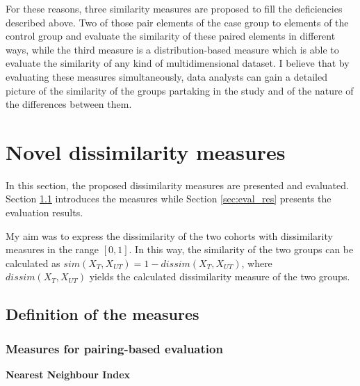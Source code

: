 
For these reasons, three similarity measures are proposed to fill the deficiencies described above. Two of those pair elements of the case group to elements of the control group and evaluate the similarity of these paired elements in different ways, while the third measure is a distribution-based measure which is able to evaluate the similarity of any kind of multidimensional dataset. I believe that by evaluating these measures simultaneously, data analysts can gain a detailed picture of the similarity of the groups partaking in the study and of the nature of the differences between them.

\section{Novel dissimilarity measures}
\label{sec:measure}

In this section, the proposed dissimilarity measures are presented and evaluated. Section \ref{sec:def_meas} introduces the measures while Section \ref{sec:eval_res} presents the evaluation results.

My aim was to express the dissimilarity of the two cohorts with dissimilarity measures in the range $[0,1]$. In this way, the similarity of the two groups can be calculated as $sim(X_{T}, X_{UT})=1-dissim(X_{T},X_{UT})$, where $dissim(X_{T},X_{UT})$ yields the calculated dissimilarity measure of the two groups.

\subsection{Definition of the measures}
\label{sec:def_meas}

\subsubsection{Measures for pairing-based evaluation}
\label{subseq:paired}

\noindent\textbf{Nearest Neighbour Index}

